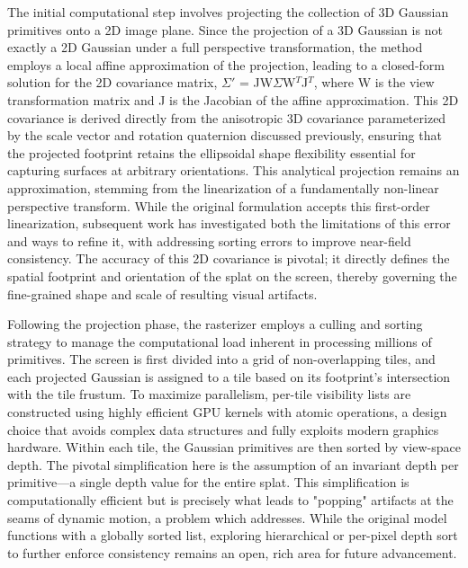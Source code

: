 \documentclass[11pt,a4paper]{article}
\begin{document}
The initial computational step involves projecting the collection of 3D Gaussian primitives onto a 2D image plane. Since the projection of a 3D Gaussian is not exactly a 2D Gaussian under a full perspective transformation, the method employs a local affine approximation of the projection, leading to a closed-form solution for the 2D covariance matrix, $\Sigma$$'$ = JW$\Sigma$W$^{T}$J$^{T}$, where W is the view transformation matrix and J is the Jacobian of the affine approximation. This 2D covariance is derived directly from the anisotropic 3D covariance parameterized by the scale vector and rotation quaternion discussed previously, ensuring that the projected footprint retains the ellipsoidal shape flexibility essential for capturing surfaces at arbitrary orientations. This analytical projection remains an approximation, stemming from the linearization of a fundamentally non-linear perspective transform. While the original formulation accepts this first-order linearization, subsequent work has investigated both the limitations of this error and ways to refine it, with \cite{arxiv:2402.00525v1} addressing sorting errors to improve near-field consistency. The accuracy of this 2D covariance is pivotal; it directly defines the spatial footprint and orientation of the splat on the screen, thereby governing the fine-grained shape and scale of resulting visual artifacts.

Following the projection phase, the rasterizer employs a culling and sorting strategy to manage the computational load inherent in processing millions of primitives. The screen is first divided into a grid of non-overlapping tiles, and each projected Gaussian is assigned to a tile based on its footprint's intersection with the tile frustum. To maximize parallelism, per-tile visibility lists are constructed using highly efficient GPU kernels with atomic operations, a design choice that avoids complex data structures and fully exploits modern graphics hardware. Within each tile, the Gaussian primitives are then sorted by view-space depth. The pivotal simplification here is the assumption of an invariant depth per primitive---a single depth value for the entire splat. This simplification is computationally efficient but is precisely what leads to "popping" artifacts at the seams of dynamic motion, a problem which \cite{arxiv:2402.00525v1} addresses. While the original model functions with a globally sorted list, exploring hierarchical or per-pixel depth sort to further enforce consistency remains an open, rich area for future advancement.
\end{document}
